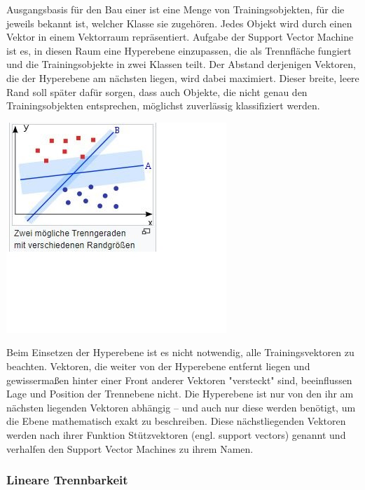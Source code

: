 \documentclass[12pt]{article}
\begin{document}
Ausgangsbasis für den Bau einer {\color{blue}{Support Vector Machine}} ist eine Menge von Trainingsobjekten, für die jeweils bekannt ist, welcher Klasse sie zugehören. Jedes Objekt wird durch einen Vektor in einem Vektorraum repräsentiert. Aufgabe der Support Vector Machine ist es, in diesen Raum eine Hyperebene einzupassen, die als Trennfläche fungiert und die Trainingsobjekte in zwei Klassen teilt. Der Abstand derjenigen Vektoren, die der Hyperebene am nächsten liegen, wird dabei maximiert. Dieser breite, leere Rand soll später dafür sorgen, dass auch Objekte, die nicht genau den Trainingsobjekten entsprechen, möglichst zuverlässig klassifiziert werden.
\begin{center} 
\includegraphics{SVM-Konzept} 
\end{center}
Beim Einsetzen der Hyperebene ist es nicht notwendig, alle Trainingsvektoren zu beachten. Vektoren, die weiter von der Hyperebene entfernt liegen und gewissermaßen hinter einer Front anderer Vektoren "versteckt" sind, beeinflussen Lage und Position der Trennebene nicht. Die Hyperebene ist nur von den ihr am nächsten liegenden Vektoren abhängig – und auch nur diese werden benötigt, um die Ebene mathematisch exakt zu beschreiben. Diese nächstliegenden Vektoren werden nach ihrer Funktion Stützvektoren (engl. support vectors) genannt und verhalfen den Support Vector Machines zu ihrem Namen.

\subsubsection{Lineare Trennbarkeit}
\end{document}
